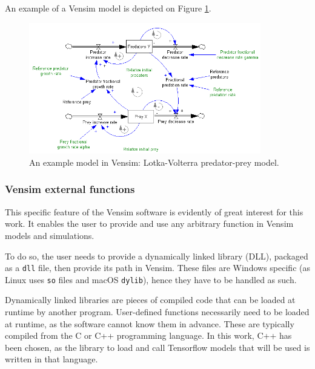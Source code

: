 An example of a Vensim model is depicted on Figure \ref{fig:vensim-model-example}.

\begin{figure}[h!]
    \includegraphics[width=0.9\textwidth]{resources/images/vensim-model-example.png}
    \caption{An example model in Vensim: Lotka-Volterra predator-prey model.}
    \label{fig:vensim-model-example}
\end{figure}

\subsubsection{Vensim external functions}

This specific feature of the Vensim software is evidently of great interest for this work. It enables the user to provide and use any arbitrary function in Vensim models and simulations.

To do so, the user needs to provide a dynamically linked library (DLL), packaged as a \texttt{dll} file, then provide its path in Vensim. These files are Windows specific (as Linux uses \texttt{so} files and macOS \texttt{dylib}), hence they have to be handled as such.

Dynamically linked libraries are pieces of compiled code that can be loaded at runtime by another program. User-defined functions necessarily need to be loaded at runtime, as the software cannot know them in advance. These are typically compiled from the C or C++ programming language. In this work, C++ has been chosen, as the library to load and call Tensorflow models that will be used is written in that language.

